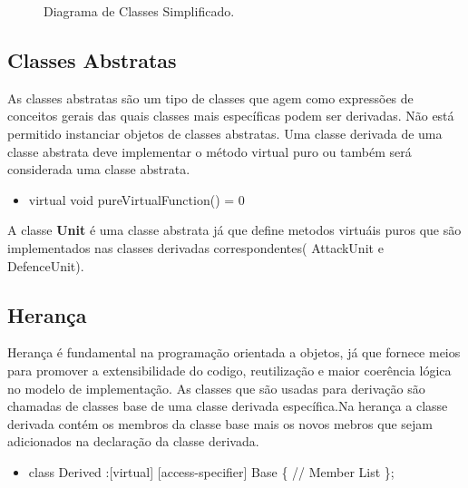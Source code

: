 \documentclass[rel_mlp]{iiufrgs}
\newcommand{\fonte}[1]{\\Fonte: {#1}}
\begin{document}
\begin{figure}[htb]
    \centering
    \label{fig:figura1}
    \caption{Diagrama de Classes Simplificado.}
\end{figure}


\subsection{Classes Abstratas}
As classes abstratas são um tipo de classes que agem como expressões de conceitos gerais das quais classes mais específicas podem ser derivadas. Não está permitido instanciar objetos de classes abstratas.
Uma classe derivada de uma classe abstrata deve implementar o método virtual puro ou também será considerada uma classe abstrata.

 \begin{itemize}
 \item virtual void pureVirtualFunction() = 0
 \end{itemize}
A classe \textbf{Unit} é uma classe abstrata já que define metodos virtuáis puros que são implementados nas classes derivadas correspondentes( AttackUnit e DefenceUnit).
\subsection{Herança}
Herança é fundamental na programação orientada a objetos, já que fornece meios para promover a extensibilidade do codigo, reutilização e maior coerência lógica no modelo de implementação. As classes que são usadas para derivação são chamadas de classes base de uma classe derivada específica.Na herança a classe derivada contém os membros da classe base mais os novos mebros que sejam adicionados na declaração da classe derivada.
 \begin{itemize}
 \item class Derived :[virtual] [access-specifier] Base
 \{ \bigbreak
 	\hspace{1cm} // Member List
	\bigbreak
 \};
 \end{itemize}
\end{document}
